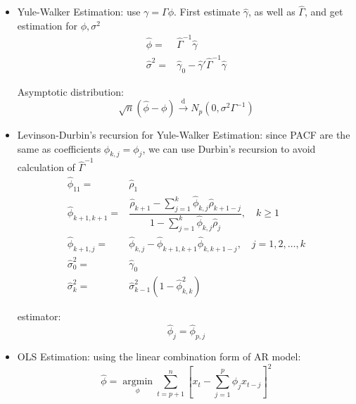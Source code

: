    \begin{itemize}[topsep=2pt,itemsep=0pt]
        \item Yule-Walker Estimation: use $ \gamma =\Gamma \phi  $. First estimate $ \hat{\gamma } $, as well as $ \hat{\Gamma } $, and get estimation for $ \phi ,\sigma ^2 $
        \begin{align}
            \hat{\phi }=& \hat{\Gamma }^{-1}\hat{\gamma }\\
            \hat{\sigma }^2=&\hat{\gamma }_0-\hat{\gamma }'\hat{\Gamma }^{-1}\hat{\gamma }
        \end{align}

        Asymptotic distribution:
        \begin{equation}
            \sqrt{n}(\hat{\phi }-\phi )\xrightarrow[]{\mathrm{d}} N_p(0,\sigma ^2\Gamma ^{-1}) 
        \end{equation}
        

        \item Levinson-Durbin's recursion for Yule-Walker Estimation: since PACF are the same as coefficients $ \phi _{k,j}=\phi _j $, we can use Durbin's recursion to avoid calculation of $ \hat{\Gamma }^{-1} $
        \begin{align}\label{EqaLevinsonDurbinInARp}
            \hat{\phi} _{11}=&\hat{\rho} _1\\
            \hat{\phi} _{k+1,k+1}=&\dfrac{\hat{\rho} _{k+1}-\sum_{j=1}^k\hat{\phi} _{k,j}\hat{\rho} _{k+1-j}}{1-\sum_{j=1}^k\hat{\phi} _{k,j}\hat{\rho} _j},\quad k\geq 1\\
            \hat{\phi} _{k+1,j}=&\hat{\phi} _{k,j}-\hat{\phi} _{k+1,k+1}\hat{\phi} _{k,k+1-j},\quad j=1,2,\ldots,k\\
            \hat{\sigma} _0^2=&\hat{\gamma }_0\\
            \hat{\sigma}_k^2 =& \hat{\sigma}_{k-1}^2 (1 - \hat{\phi}_{k,k}^2)
        \end{align}

        estimator:
        \begin{equation}
            \hat{\phi }_j=\hat{\phi }_{p,j} 
        \end{equation}
        
        



        \item OLS Estimation: using the linear combination form of AR model:
        \begin{equation}
            \hat{\phi }=\mathop{\arg\min}\limits_{\phi } \sum_{t=p+1}^n \left[ x_t-\sum_{j=1}^p \phi _jx_{t-j} \right]^2
        \end{equation}
        

\end{itemize}
